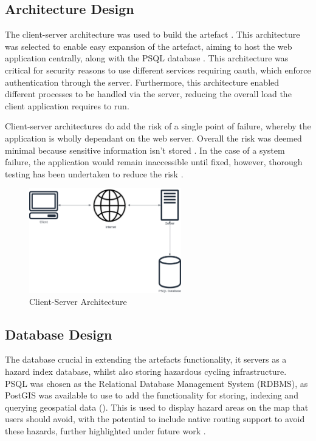 \subsection{Architecture Design}
\label{system:architecture-design}

The client-server architecture was used to build the artefact . This architecture was selected to enable easy expansion of the artefact, aiming to host the web application centrally, along with the PSQL database . This architecture was critical for security reasons to use different services requiring oauth, which enforce authentication through the server. Furthermore, this architecture enabled different processes to be handled via the server, reducing the overall load the client application requires to run.

Client-server architectures do add the risk of a single point of failure, whereby the application is wholly dependant on the web server. Overall the risk was deemed minimal because sensitive information isn't stored . In the case of a system failure, the application would remain inaccessible until fixed, however, thorough testing has been undertaken to reduce the risk .

\clearpage
\begin{figure}[!ht]
  \centering
  \includegraphics[width=250px]{figures/client-server.png}
  \caption{Client-Server Architecture}
  \label{fig:clientserver}
\end{figure}

\subsection{Database Design}
\label{system:database-design}

The database crucial in extending the artefacts functionality, it servers as a hazard index database, whilst also storing hazardous cycling infrastructure. PSQL was chosen as the Relational Database Management System (RDBMS), as PostGIS was available to use to add the functionality for storing, indexing and querying geospatial data (\cite{noauthor_postgis_nodate}). This is used to display hazard areas on the map that users should avoid, with the potential to include native routing support to avoid these hazards, further highlighted under future work  . 

